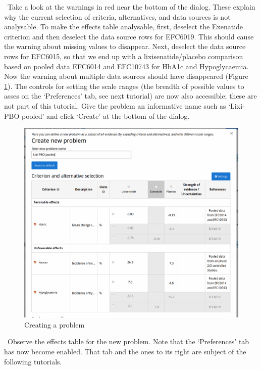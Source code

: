 \documentclass[00_mcda_tutorial.tex]{subfiles}
\begin{document}
\noindent \leftpointright \, Take a look at the warnings in red near the bottom of the dialog. These explain why the current selection of criteria, alternatives, and data sources is not analysable. To make the effects table analysable, first, deselect the Exenatide criterion and then deselect the data source rows for EFC6019. This should cause the warning about missing values to disappear. Next, deselect the data source rows for EFC6015, so that we end up with a lixisenatide/placebo comparison based on pooled data EFC6014 and EFC10743 for HbA1c and Hypoglycaemia. Now the warning about multiple data sources should have disappeared (Figure \ref{fig:create_lixi_placebo}). The controls for setting the scale ranges (the breadth of possible values to asses on the ‘Preferences’ tab, see next tutorial) are now also accessible; these are not part of this tutorial. Give the problem an informative name such as ‘Lixi-PBO pooled’ and click ‘Create’ at the bottom of the dialog.

\begin{figure}[!h]
    \centering
	\includegraphics[width=\textwidth]{fig/createLixiPlacebo.png}
    \caption{Creating a problem}
	\label{fig:create_lixi_placebo}
\end{figure}

\noindent \leftpointright \, Observe the effects table for the new problem. Note that the ‘Preferences’ tab has now become enabled. That tab and the ones to its right are subject of the following tutorials.
\end{document}

